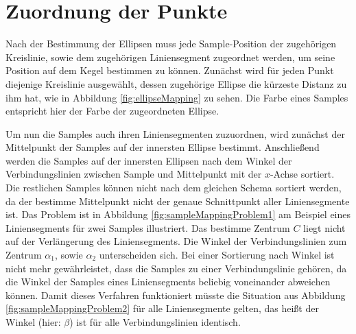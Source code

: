 \section{Zuordnung der Punkte}
\label{s:pointMapping}
Nach der Bestimmung der Ellipsen muss jede Sample-Position der zugehörigen Kreislinie, sowie dem zugehörigen Liniensegment zugeordnet werden, um seine Position auf dem Kegel bestimmen zu können.
Zunächst wird für jeden Punkt diejenige Kreislinie ausgewählt, dessen zugehörige Ellipse die kürzeste Distanz zu ihm hat, wie in Abbildung \ref{fig:ellipseMapping} zu sehen. Die Farbe eines Samples entspricht hier der Farbe der zugeordneten Ellipse.

Um nun die Samples auch ihren Liniensegmenten zuzuordnen, wird zunächst der Mittelpunkt der Samples auf der innersten Ellipse bestimmt. Anschließend werden die Samples auf der innersten Ellipsen nach dem Winkel der Verbindungslinien zwischen Sample und Mittelpunkt mit der $x$-Achse sortiert.
Die restlichen Samples können nicht nach dem gleichen Schema sortiert werden, da der bestimme Mittelpunkt nicht der genaue Schnittpunkt aller Liniensegmente ist.
Das Problem ist in Abbildung \ref{fig:sampleMappingProblem1} am Beispiel eines Liniensegments für zwei Samples illustriert. Das bestimme Zentrum $C$ liegt nicht auf der Verlängerung des Liniensegments.  Die Winkel der Verbindungslinien zum Zentrum $\alpha_1$, sowie $\alpha_2$ unterscheiden sich. Bei einer Sortierung nach Winkel ist nicht mehr gewährleistet, dass die Samples zu einer Verbindungslinie gehören, da die Winkel der Samples eines Liniensegments beliebig voneinander abweichen können.  Damit dieses Verfahren funktioniert müsste die Situation aus Abbildung \ref{fig:sampleMappingProblem2} für alle Liniensegmente gelten, das heißt der Winkel (hier: $\beta$) ist für alle Verbindungslinien identisch.

